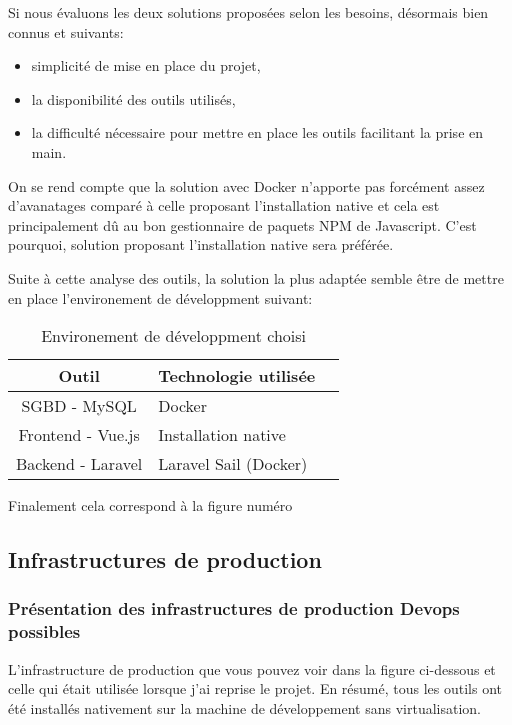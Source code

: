 \documentclass[
    iai, %
    il, %
]{heig-tb}
\begin{document}
Si nous évaluons les deux solutions proposées selon les besoins, désormais bien connus et suivants:
\begin{itemize}
    \item simplicité de mise en place du projet,
    \item la disponibilité des outils utilisés,
    \item la difficulté nécessaire pour mettre en place les outils facilitant la prise en main.
\end{itemize}

On se rend compte que la solution avec Docker n'apporte pas forcément assez d'avanatages comparé à celle proposant l'installation native et cela est principalement dû au bon gestionnaire de paquets NPM de Javascript. C'est pourquoi, solution proposant l'installation native sera préférée.

Suite à cette analyse des outils, la solution la plus adaptée semble être de mettre en place l'environement de développment suivant:

\begin{table}[h]
    \begin{center}
        \caption{Environement de développment choisi \label{env_dev}}
        \begin{tabular}{c|l|r}
            Outil             & Technologie utilisée  \\ \hline
            SGBD - MySQL      & Docker                \\
            Frontend - Vue.js & Installation native   \\
            Backend - Laravel & Laravel Sail (Docker) \\
        \end{tabular}
    \end{center}
\end{table}


Finalement cela correspond à la figure numéro %

\clearpage
\subsection{Infrastructures de production}

\subsubsection{Présentation des infrastructures de production Devops possibles}
L'infrastructure de production que vous pouvez voir dans la figure ci-dessous et celle qui était utilisée lorsque j'ai reprise le projet.
En résumé, tous les outils ont été installés nativement sur la machine de développement sans virtualisation.
\end{document}
